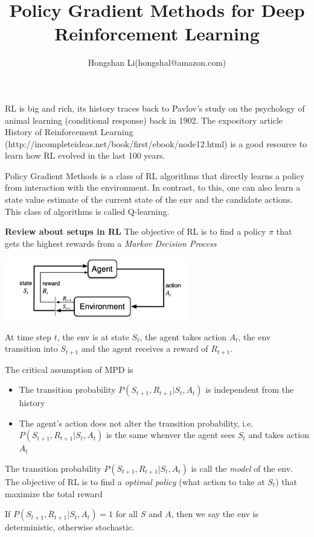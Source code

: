 \documentclass{article}
\title{Policy Gradient Methods for Deep Reinforcement Learning}
\author{Hongshan Li(hongshal@amazon.com)}
\begin{document}
\maketitle

RL is big and rich, its history traces back to Pavlov's study on the 
psychology of animal learning (conditional response) back in 1902.
The expository article History of Reinforcement Learning (http://incompleteideas.net/book/first/ebook/node12.html) is a good resource to learn
how RL evolved in the last 100 years.

Policy Gradient Methods is a class of RL algorithms that directly 
learns a policy from interaction with the environment. In contrast,
to this, one can also learn a state value estimate of the current
state of the env and the candidate actions. This class of algorithms
is called Q-learning. 


\textbf{Review about setups in RL}
The objective of RL is to find a policy $\pi$ that gets the highest 
rewards from a \emph{Markov Decision Process}

\includegraphics[width=8cm]{mdp}

At time step $t$, the env is at state $S_t$, the agent takes action 
$A_t$, the env transition into $S_{t+1}$ and the agent receives a 
reward of $R_{t+1}$. 

The critical assumption of MPD is
\begin{itemize}
    \item The transition probability $P(S_{t+1}, R_{t+1}|S_t, A_t)$ is
        independent from the history
    \item The agent's action does not alter the transition probability,
        i.e. $P(S_{t+1}, R_{t+1} | S_t, A_t)$ is the same whenver 
        the agent sees $S_t$ and takes action $A_t$
\end{itemize}

The transition probability $P(S_{t+1}, R_{t+1} | S_t, A_t)$ is call 
the \emph{model} of the env. The objective of RL is to find a
\emph{optimal policy}
(what action to take at $S_t$) that maximize the total reward

If $P(S_{t+1}, R_{t+1}|S_t, A_t) = 1$ for all $S$ and $A$, then we say
the env is deterministic, otherwise stochastic.
\end{document}
